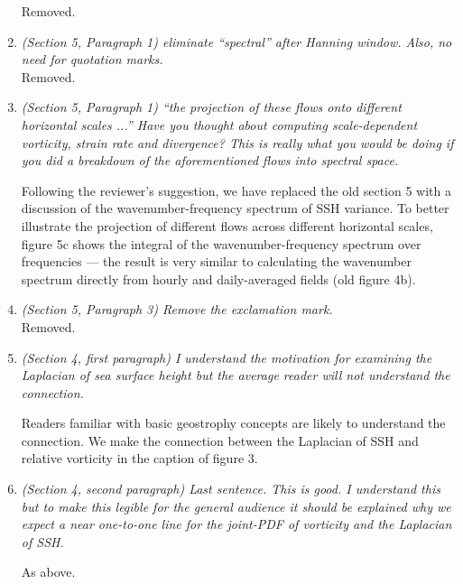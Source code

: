 \documentclass[11pt]{article}
\newcommand{\bdp}{\begin{description}}
\newcommand{\edp}{\end{description}}
\begin{document}
\begin{enumerate}
        Removed.

\item {\it (Section 5, Paragraph 1) eliminate ``spectral'' after Hanning window. Also, no need for
        quotation marks.}\\

        Removed.

\item {\it (Section 5, Paragraph 1) ``the projection of these flows onto different horizontal scales
            ...'' Have you thought about computing scale-dependent vorticity, strain rate and
            divergence? This is really what you would be doing if you did a breakdown
            of the aforementioned flows into spectral space.}

            \bdp
                Following the reviewer's suggestion, we have replaced the old section
                5 with a discussion of the wavenumber-frequency spectrum of SSH variance.
                To better illustrate the projection of different flows across
                different horizontal scales, figure 5c shows the integral of the
                wavenumber-frequency spectrum over frequencies --- the result is
                very similar to calculating the wavenumber spectrum directly from
                hourly and daily-averaged fields (old figure 4b).
            \edp

\item {\it (Section 5, Paragraph 3) Remove the exclamation mark.}\\

    Removed.

\item {\it (Section 4, first paragraph) I understand the motivation for examining the Laplacian of
      sea surface height but the average reader will not understand the connection.}

      \bdp
      Readers familiar with basic geostrophy concepts are likely to understand the connection.
      We make the connection between the Laplacian of SSH and relative vorticity
      in the caption of figure 3.
      \edp

\item {\it (Section 4, second paragraph) Last sentence. This is good. I understand this but to
        make this legible for the general audience it should be explained why we expect a near
        one-to-one line for the joint-PDF of vorticity and the Laplacian of SSH.}

      As above.


\end{enumerate}
\end{document}
